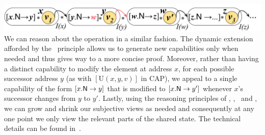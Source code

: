 %
{\centering \includegraphics[scale=0.25]{Sections/Examples/Images/add3.pdf}\\}
%
We can reason about the  operation in a similar fashion. The dynamic extension afforded by the \extendRule\ principle allows us to generate new capabilities only when needed and thus gives way to a more concise proof. 
%
Moreover, rather than having a distinct capability to modify the element at address $x$, for each possible successor address $y$ (as with $[\text{U}(x, y, v)]$ in CAP), we appeal to a single capability of the form $[\nextC{x}{y}]$ that is modified to $[\nextC{x}{y'}]$ whenever $x$'s successor changes from $y$ to $y'$.
%
Lastly, using the reasoning principles of \mergeRule, \forgetRule, \shiftRule\ and \copyRule, we can grow and shrink our subjective views as needed and consequently at any one point we only view the relevant parts of the shared state. 
%
The technical details can be found in~\cite{colosl-tr14}. 
